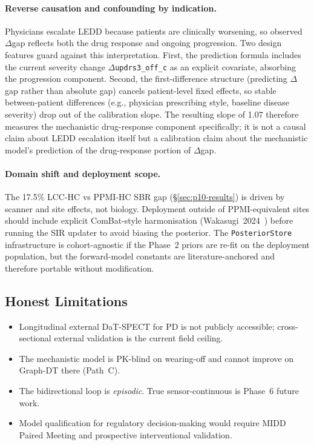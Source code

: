 \paragraph{Reverse causation and confounding by indication.} Physicians escalate LEDD because patients are clinically worsening, so observed $\Delta$gap reflects both the drug response and ongoing progression. Two design features guard against this interpretation. First, the prediction formula includes the current severity change $\Delta$\texttt{updrs3\_off\_c} as an explicit covariate, absorbing the progression component. Second, the first-difference structure (predicting $\Delta$gap rather than absolute gap) cancels patient-level fixed effects, so stable between-patient differences (e.g., physician prescribing style, baseline disease severity) drop out of the calibration slope. The resulting slope of 1.07 therefore measures the mechanistic drug-response component specifically; it is not a causal claim about LEDD escalation itself but a calibration claim about the mechanistic model's prediction of the drug-response portion of $\Delta$gap.

\paragraph{Domain shift and deployment scope.} The 17.5\% LCC-HC vs PPMI-HC SBR gap (\S\ref{sec:p10-results}) is driven by scanner and site effects, not biology. Deployment outside of PPMI-equivalent sites should include explicit ComBat-style harmonisation (Wakasugi~2024~\cite{wakasugi2024combat}) before running the SIR updater to avoid biasing the posterior. The \texttt{PosteriorStore} infrastructure is cohort-agnostic if the Phase~2 priors are re-fit on the deployment population, but the forward-model constants are literature-anchored and therefore portable without modification.

\subsection{Honest Limitations}

\begin{itemize}
\item Longitudinal external DaT-SPECT for PD is not publicly accessible; cross-sectional external validation is the current field ceiling.
\item The mechanistic model is PK-blind on wearing-off and cannot improve on Graph-DT there (Path~C).
\item The bidirectional loop is \emph{episodic}. True sensor-continuous is Phase~6 future work.
\item Model qualification for regulatory decision-making would require MIDD Paired Meeting and prospective interventional validation.
\end{itemize}

